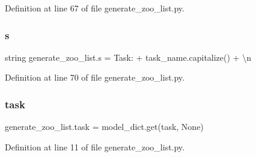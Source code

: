 Definition at line 67 of file generate\+\_\+zoo\+\_\+list.\+py.

\mbox{\label{namespacegenerate__zoo__list_ab242661624dc2add618658bc9873f621}} 
\subsubsection{\texorpdfstring{s}{s}}
{\footnotesize\ttfamily string generate\+\_\+zoo\+\_\+list.\+s = \textquotesingle{}Task\+: \textquotesingle{} + task\+\_\+name.\+capitalize() + \textquotesingle{}\textbackslash{}n\textquotesingle{}}



Definition at line 70 of file generate\+\_\+zoo\+\_\+list.\+py.

\mbox{\label{namespacegenerate__zoo__list_ad3dbd35f1d59cff673fdcbc18b300da2}} 
\subsubsection{\texorpdfstring{task}{task}}
{\footnotesize\ttfamily generate\+\_\+zoo\+\_\+list.\+task = model\+\_\+dict.\+get(\textquotesingle{}task\textquotesingle{}, None)}



Definition at line 11 of file generate\+\_\+zoo\+\_\+list.\+py.

